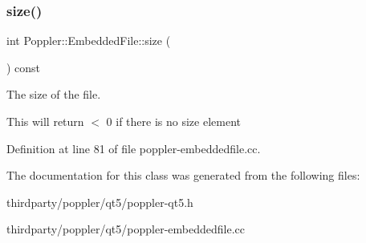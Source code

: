 \subsubsection{\texorpdfstring{size()}{size()}}
{\footnotesize\ttfamily int Poppler\+::\+Embedded\+File\+::size (\begin{DoxyParamCaption}{ }\end{DoxyParamCaption}) const}

The size of the file.

This will return $<$ 0 if there is no size element 

Definition at line 81 of file poppler-\/embeddedfile.\+cc.



The documentation for this class was generated from the following files\+:\begin{DoxyCompactItemize}
\item 
thirdparty/poppler/qt5/poppler-\/qt5.\+h\item 
thirdparty/poppler/qt5/poppler-\/embeddedfile.\+cc\end{DoxyCompactItemize}
